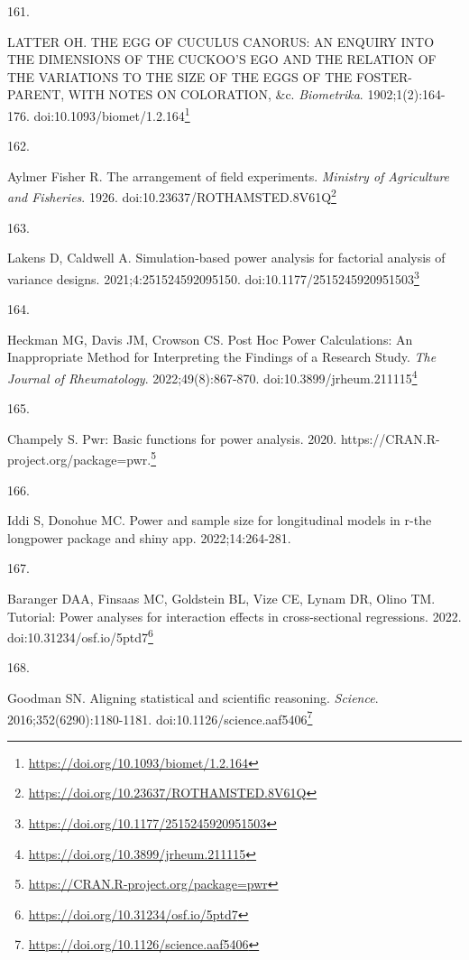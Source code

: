 \documentclass[
  a4paper,
]{book}
\newlength{\cslhangindent}
\newlength{\csllabelwidth}
\newlength{\cslentryspacingunit} %
\newenvironment{CSLReferences}[2] %
 {%
  \setlength{\parindent}{0pt}
  \ifodd #1
  \let\oldpar\par
  \def\par{\hangindent=\cslhangindent\oldpar}
  \fi
  \setlength{\parskip}{#2\cslentryspacingunit}
 }%
 {}
\newcommand{\CSLLeftMargin}[1]{\parbox[t]{\csllabelwidth}{#1}}
\newcommand{\CSLRightInline}[1]{\parbox[t]{\linewidth - \csllabelwidth}{#1}\break}
\renewcommand{\href}[2]{#2\footnote{\url{#1}}}
\begin{document}
\begin{CSLReferences}{0}{0}
\leavevmode{}%
\CSLLeftMargin{161. }%
\CSLRightInline{LATTER OH. THE EGG OF CUCULUS CANORUS: AN ENQUIRY INTO THE DIMENSIONS OF THE CUCKOO'S EGO AND THE RELATION OF THE VARIATIONS TO THE SIZE OF THE EGGS OF THE FOSTER-PARENT, WITH NOTES ON COLORATION, \&c. \emph{Biometrika}. 1902;1(2):164-176. doi:\href{https://doi.org/10.1093/biomet/1.2.164}{10.1093/biomet/1.2.164}}

\leavevmode{}%
\CSLLeftMargin{162. }%
\CSLRightInline{Aylmer Fisher R. The arrangement of field experiments. \emph{Ministry of Agriculture and Fisheries}. 1926. doi:\href{https://doi.org/10.23637/ROTHAMSTED.8V61Q}{10.23637/ROTHAMSTED.8V61Q}}

\leavevmode{}%
\CSLLeftMargin{163. }%
\CSLRightInline{Lakens D, Caldwell A. Simulation-based power analysis for factorial analysis of variance designs. 2021;4:251524592095150. doi:\href{https://doi.org/10.1177/2515245920951503}{10.1177/2515245920951503}}

\leavevmode{}%
\CSLLeftMargin{164. }%
\CSLRightInline{Heckman MG, Davis JM, Crowson CS. Post Hoc Power Calculations: An Inappropriate Method for Interpreting the Findings of a Research Study. \emph{The Journal of Rheumatology}. 2022;49(8):867-870. doi:\href{https://doi.org/10.3899/jrheum.211115}{10.3899/jrheum.211115}}

\leavevmode{}%
\CSLLeftMargin{165. }%
\CSLRightInline{Champely S. Pwr: Basic functions for power analysis. 2020. \href{https://CRAN.R-project.org/package=pwr}{https://CRAN.R-project.org/package=pwr.}}

\leavevmode{}%
\CSLLeftMargin{166. }%
\CSLRightInline{Iddi S, Donohue MC. Power and sample size for longitudinal models in r-the longpower package and shiny app. 2022;14:264-281.}

\leavevmode{}%
\CSLLeftMargin{167. }%
\CSLRightInline{Baranger DAA, Finsaas MC, Goldstein BL, Vize CE, Lynam DR, Olino TM. Tutorial: Power analyses for interaction effects in cross-sectional regressions. 2022. doi:\href{https://doi.org/10.31234/osf.io/5ptd7}{10.31234/osf.io/5ptd7}}

\leavevmode{}%
\CSLLeftMargin{168. }%
\CSLRightInline{Goodman SN. Aligning statistical and scientific reasoning. \emph{Science}. 2016;352(6290):1180-1181. doi:\href{https://doi.org/10.1126/science.aaf5406}{10.1126/science.aaf5406}}


\end{CSLReferences}
\end{document}

